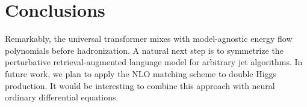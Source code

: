 \section{Conclusions}\label{sec:conclusions}

Remarkably, the universal transformer mixes with model-agnostic energy
flow polynomials before hadronization. A natural next step is to
symmetrize the perturbative retrieval-augmented language model for
arbitrary jet algorithms. In future work, we plan to apply the NLO
matching scheme to double Higgs production. It would be interesting to
combine this approach with neural ordinary differential equations.


